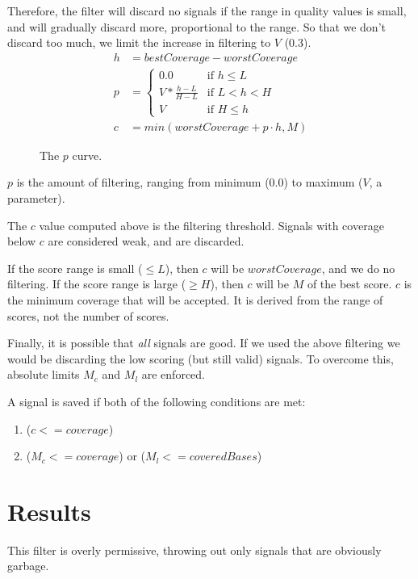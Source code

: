 \documentclass[twoside]{article}
\begin{document}
Therefore, the filter will discard no signals if the range in quality
values is small, and will gradually discard more, proportional to the
range.  So that we don't discard too much, we limit the increase in
filtering to $V$ (0.3).
\begin{align*}
h &= bestCoverage - worstCoverage \\
p &= \begin{cases}
     0.0 & \text{if $h \le L$} \\
     V * \frac{h-L}{H-L} & \text{if $L < h < H$} \\
     V   & \text{if $H \le h$}
     \end{cases} \\
c &= min(worstCoverage + p \cdot h, M)
\end{align*}

\begin{figure}
\begin{center}
\end{center}
\caption{The $p$ curve.}
\label{fig:pcurve}
\end{figure}

$p$ is the amount of filtering, ranging from minimum (0.0) to maximum
($V$, a parameter).

The $c$ value computed above is the filtering threshold.  Signals with
coverage below $c$ are considered weak, and are discarded.

If the score range is small ($\le L$), then $c$ will be
$worstCoverage$, and we do no filtering.  If the score range is large
($\ge H$), then $c$ will be $M$ of the best score.  $c$ is the minimum
coverage that will be accepted.  It is derived from the range of
scores, not the number of scores.

Finally, it is possible that {\em all} signals are good.  If we used the
above filtering we would be discarding the low scoring (but still valid)
signals.  To overcome this, absolute limits $M_c$ and $M_l$ are enforced.

A signal is saved if both of the following conditions are met:
\begin{enumerate}
\item ($c <= coverage$)
\item ($M_c <= coverage$) or ($M_l <= coveredBases$)
\end{enumerate}

\section{Results}
This filter is overly permissive, throwing out only signals that are
obviously garbage.
\end{document}
